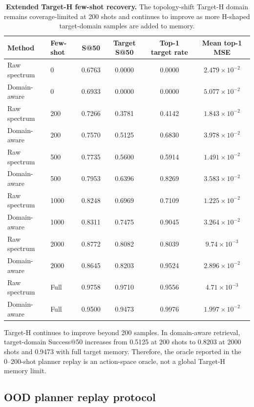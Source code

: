 \documentclass[final,1p,times]{elsarticle}
\begin{document}
\begin{table}[htbp!]
\centering
\caption{\textbf{Extended Target-H few-shot recovery.}
The topology-shift Target-H domain remains coverage-limited at 200 shots and continues to improve as more H-shaped target-domain samples are added to memory.}
\label{tab:si_phase4_target_h_extended}
\footnotesize
\setlength{\tabcolsep}{4.2pt}
\renewcommand{\arraystretch}{1.12}
\begin{tabular}{llcccc}
\toprule
Method & Few-shot & S@50 & Target S@50 & Top-1 target rate & Mean top-1 MSE \\
\midrule
Raw spectrum & 0 & 0.6763 & 0.0000 & 0.0000 & $2.479\times10^{-2}$ \\
Domain-aware & 0 & 0.6933 & 0.0000 & 0.0000 & $5.077\times10^{-2}$ \\
Raw spectrum & 200 & 0.7266 & 0.3781 & 0.4142 & $1.843\times10^{-2}$ \\
Domain-aware & 200 & 0.7570 & 0.5125 & 0.6830 & $3.978\times10^{-2}$ \\
Raw spectrum & 500 & 0.7735 & 0.5600 & 0.5914 & $1.491\times10^{-2}$ \\
Domain-aware & 500 & 0.7953 & 0.6396 & 0.8269 & $3.583\times10^{-2}$ \\
Raw spectrum & 1000 & 0.8248 & 0.6969 & 0.7109 & $1.225\times10^{-2}$ \\
Domain-aware & 1000 & 0.8311 & 0.7475 & 0.9045 & $3.264\times10^{-2}$ \\
Raw spectrum & 2000 & 0.8772 & 0.8082 & 0.8039 & $9.74\times10^{-3}$ \\
Domain-aware & 2000 & 0.8645 & 0.8203 & 0.9524 & $2.896\times10^{-2}$ \\
Raw spectrum & Full & 0.9758 & 0.9710 & 0.9556 & $4.71\times10^{-3}$ \\
Domain-aware & Full & 0.9500 & 0.9473 & 0.9976 & $1.997\times10^{-2}$ \\
\bottomrule
\end{tabular}
\end{table}

Target-H continues to improve beyond 200 samples. In domain-aware retrieval, target-domain Success@50 increases from 0.5125 at 200 shots to 0.8203 at 2000 shots and 0.9473 with full target memory. Therefore, the oracle reported in the 0--200-shot planner replay is an action-space oracle, not a global Target-H memory limit.

\subsection{OOD planner replay protocol}
\end{document}
